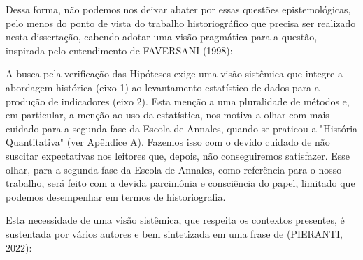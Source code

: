 Dessa forma, não podemos nos deixar abater por essas questões epistemológicas, pelo menos do ponto de vista do trabalho historiográfico que precisa ser realizado nesta dissertação, cabendo adotar uma visão pragmática para a questão, inspirada pelo entendimento de FAVERSANI (1998):


\noindent\begin{flushright}\mbox{\linespread{1}\selectfont\centering{}}\end{flushright}


A busca pela verificação das Hipóteses exige uma visão sistêmica que integre a abordagem histórica (eixo 1) ao levantamento estatístico de dados para a produção de indicadores (eixo 2). Esta menção a uma pluralidade de métodos e, em particular, a menção ao uso da estatística, nos motiva a olhar com mais cuidado para a segunda fase da Escola de Annales, quando se praticou a "História Quantitativa" (ver Apêndice A). Fazemos isso com o devido cuidado de não suscitar expectativas nos leitores que, depois, não conseguiremos satisfazer. Esse olhar, para a segunda fase da Escola de Annales, como referência para o nosso trabalho, será feito com a devida parcimônia e consciência do papel, limitado que podemos desempenhar em termos de historiografia.

Esta necessidade de uma visão sistêmica, que respeita os contextos presentes, é sustentada por vários autores e bem sintetizada em uma frase de (PIERANTI, 2022):


\noindent\begin{flushright}\mbox{\linespread{1}\selectfont\centering{}}\end{flushright}


